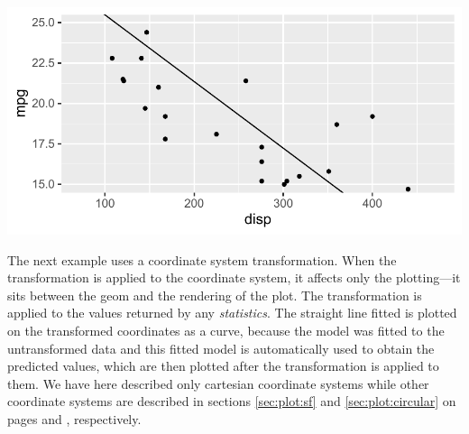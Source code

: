 \documentclass[krantz2]{krantz}\usepackage{knitr}
\begin{document}
\begin{knitrout}\footnotesize
{}\color{fgcolor}\begin{kframe}
\begin{alltt}
\hlstd{(} 
       \hlstd{(}    \hlopt{+}
  \hlstd{()} \hlopt{+}
  \hlstd{(} \hlstd{=} \hlstd{,}  \hlstd{=} \hlstd{,}   \hlopt{~}  \hlopt{+}
  \hlstd{(} \hlstd{=} \hlstd{(}\hlstd{,} \hlstd{))}
\end{alltt}
\end{kframe}

{\centering \includegraphics[width=.7\textwidth]{figure/pos-ggplot-basics-07-1}

}



\end{knitrout}

The next example uses a coordinate system transformation. When the transformation is applied to the coordinate system, it affects only the plotting---it sits between the geom and the rendering of the plot. The transformation is applied to the values returned by any \emph{statistics}. The straight line fitted is plotted on the transformed coordinates as a curve, because the model was fitted to the untransformed data and this fitted model is automatically used to obtain the predicted values, which are then plotted after the transformation is applied to them. We have here described only cartesian coordinate systems while other coordinate systems are described in sections \ref{sec:plot:sf} and \ref{sec:plot:circular} on pages \pageref{sec:plot:sf} and \pageref{sec:plot:circular}, respectively.
\end{document}
